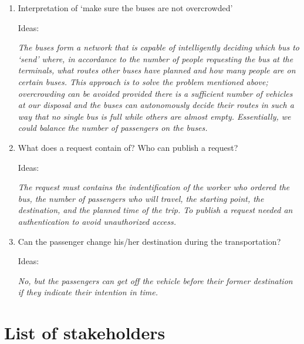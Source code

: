 \documentclass[a4paper]{article}
\begin{document}
\begin{enumerate}
	\item Interpretation of ‘make sure the buses are not overcrowded’

		Ideas:

		\textit{The buses form a network that is capable of
			intelligently deciding which bus to ‘send’ where, in
			accordance to the number of people \gls{request}ing the
			bus at the \gls{terminal}s, what \gls{route}s other
			buses have planned and how many people are on certain
			buses. This approach is to solve the problem mentioned
			above; overcrowding can be avoided provided there is a
			sufficient number of \gls{vehicle}s at our disposal and
			the buses can \gls{autonomous}ly decide their
			\gls{route}s in such a way that no single bus is full
			while others are almost empty. Essentially, we could
			balance the number of passengers on the buses.}

	\item What does a \gls{request} contain of? Who can publish a
	      \gls{request}?

		Ideas:

		\textit{The \gls{request} must contains the indentification of
			the worker who ordered the bus, the number of passengers
			who will travel, the starting point, the destination,
			and the planned time of the trip. To publish a
			\gls{request} needed an authentication to avoid
			un\gls{authorized} access.}

	\item Can the passenger change his/her destination during the
	      \gls{transportation}?

		Ideas:

		\textit{No, but the passengers can get off the \gls{vehicle}
			before their former destination if they indicate their
			intention in time.}
\end{enumerate}


\section{List of stakeholders}

%
%
%
%
%
\end{document}
